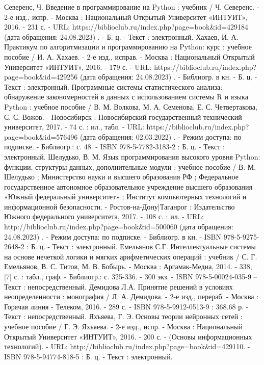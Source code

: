 \begin{thebibliography}{50}
     Северенс, Ч.   Введение в программирование на Python : учебник / Ч. Северенс. - 2-е изд., испр. - Москва : Национальный Открытый Университет «ИНТУИТ», 2016. - 231 с. - URL: https://biblioclub.ru/index.php?page=book\&id=429184 (дата обращения: 24.08.2023) . - Б. ц. - Текст : электронный.
     Хахаев, И. А.   Практикум по алгоритмизации и программированию на Python: курс : учебное пособие / И. А. Хахаев. - 2-е изд., исправ. - Москва : Национальный Открытый Университет «ИНТУИТ», 2016. - 179 с. - URL: https://biblioclub.ru/index.php?page=book\&id=429256 (дата обращения: 24.08.2023) . - Библиогр. в кн. - Б. ц. - Текст : электронный.
     Программные системы статистического анализа: обнаружение закономерностей в данных с использованием системы R и языка Python : учебное пособие / В. М. Волкова, М. А. Семенова, Е. С. Четвертакова, С. С. Вожов. - Новосибирск : Новосибирский государственный технический университет, 2017. - 74 с. : ил., табл. - URL: https://biblioclub.ru/index.php?page=book\&id=576496 (дата обращения: 02.03.2022) . - Режим доступа: по подписке. - Библиогр.: с. 48. - ISBN 978-5-7782-3183-2 : Б. ц. - Текст : электронный.
     Шелудько, В. М.  Язык программирования высокого уровня Python: функции, структуры данных, дополнительные модули : учебное пособие / В. М. Шелудько ; Министерство науки и высшего образования РФ ; Федеральное государственное автономное образовательное учреждение высшего образования «Южный федеральный университет» ; Институт компьютерных технологий и информационной безопасности. - Ростов-на-Дону|Таганрог : Издательство Южного федерального университета, 2017. - 108 с. : ил. - URL: http://biblioclub.ru/index.php?page=book\&id=500060 (дата обращения: 24.08.2023) . - Режим доступа: по подписке. - Библиогр. в кн. - ISBN 978-5-9275-2648-2 : Б. ц. - Текст : электронный.
     Емельянов С.Г.   Интеллектуальные системы на основе нечеткой логики и мягких арифметических операций : учебник / С. Г. Емельянов, В. С. Титов, М. В. Бобырь. - Москва : Аргамак-Медиа, 2014. - 338, [7] с. : табл., граф. - Библиогр.: с. 325-336. - 300 экз. - ISBN 978-5-00024-035-9 –  Текст : непосредственный.
     Демидова Л.А.  Принятие решений в условиях неопределенности : монография / Л. А. Демидова. - 2-е изд., перераб. - Москва : Горячая линия - Телеком, 2016. - 289 с. - ISBN 978-5-9912-0513-9 : 368.68 р. - Текст : непосредственный.
     Яхъяева, Г. Э.   Основы теории нейронных сетей : учебное пособие / Г. Э. Яхъяева. - 2-е изд., испр. - Москва : Национальный Открытый Университет «ИНТУИТ», 2016. - 200 с. - (Основы информационных технологий). - URL: http://biblioclub.ru/index.php?page=book\&id=429110. - ISBN 978-5-94774-818-5 : Б. ц. - Текст : электронный.

\end{thebibliography}
